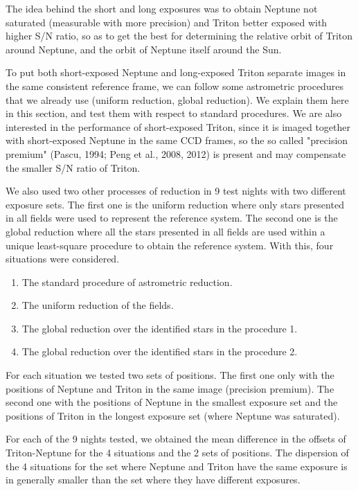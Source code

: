\documentclass[12pt,a4paper]{report}
\begin{document}
The idea behind the short and long exposures was to obtain Neptune not saturated (measurable with more precision) and Triton better exposed with higher S/N ratio, so as to get the best for determining the relative orbit of Triton around Neptune, and the orbit of Neptune itself around the Sun.

To put both short-exposed Neptune and long-exposed Triton separate images in the same consistent reference frame, we can follow some astrometric procedures that we already use (uniform reduction, global reduction). We explain them here in this section, and test them with respect to standard procedures. We are also interested in the performance of short-exposed Triton, since it is imaged together with short-exposed Neptune in the same CCD frames, so the so called "precision premium" (Pascu, 1994; Peng et al., 2008, 2012) is present and may compensate the smaller S/N ratio of Triton.

We also used two other processes of reduction in 9 test nights with two different exposure sets. The first one is the uniform reduction where only stars presented in all fields were used to represent the reference system. The second one is the global reduction where all the stars presented in all fields are used within a unique least-square procedure to obtain the reference system. With this, four situations were considered.

\begin{enumerate}
\item The standard procedure of astrometric reduction.
\item The uniform reduction of the fields.
\item The global reduction over the identified stars in the procedure 1.
\item The global reduction over the identified stars in the procedure 2.
\end{enumerate}

For each situation we tested two sets of positions. The first one only with the positions of Neptune and Triton in the same image (precision premium). The second one with the positions of Neptune in the smallest exposure set and the positions of Triton in the longest exposure set (where Neptune was saturated).

For each of the 9 nights tested, we obtained the mean difference in the offsets of Triton-Neptune for the 4 situations and the 2 sets of positions. The dispersion of the 4 situations for the set where Neptune and Triton have the same exposure is in generally smaller than the set where they have different exposures.
\end{document}
